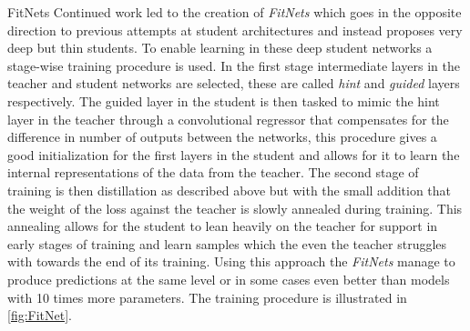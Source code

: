 \documentclass{kththesis}
\newcommand{\bibentry}[1]{\parencite{#1}}
\newcommand{\subsubsubsection}{}
\begin{document}
\subsubsubsection{FitNets}
Continued work led to the creation of \emph{FitNets}
\bibentry{romero2014fitnets} which goes in the opposite direction to previous
attempts at student architectures and instead proposes very deep but thin
students. To enable learning in these deep student networks a stage-wise
training procedure is used. In the first stage intermediate layers in the
teacher and student networks are selected, these are called \emph{hint} and
\emph{guided} layers respectively. The guided layer in the student is then
tasked to mimic the hint layer in the teacher through a convolutional regressor
that compensates for the difference in number of outputs between the networks,
this procedure gives a good initialization for the first layers in the student
and allows for it to learn the internal representations of the data from the
teacher. The second stage of training is then distillation as described above
but with the small addition that the weight of the loss against the teacher is
slowly annealed during training. This annealing allows for the student to lean
heavily on the teacher for support in early stages of training and learn samples
which the even the teacher struggles with towards the end of its training. Using
this approach the \emph{FitNets} manage to produce predictions at the same level
or in some cases even better than models with 10 times more parameters. The
training procedure is illustrated in \cref{fig:FitNet}.
\end{document}
